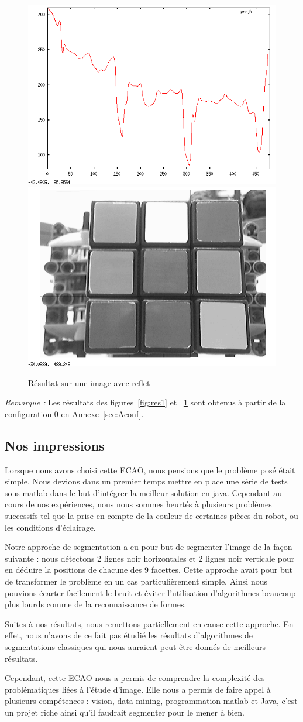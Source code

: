   \begin{figure}[!ht]
    \centering
    \includegraphics[width=0.4\linewidth]{./Images/projY_2.png}
    \includegraphics[width=0.4\linewidth]{./Images/face_2.png}
    \caption{Résultat sur une image avec reflet}
    \label{fig:res2}
   \end{figure}

\textit{Remarque : } Les résultats des figures~\ref{fig:res1} et ~\ref{fig:res2} sont obtenus à partir de la configuration 0 en Annexe~\ref{sec:Aconf}. 

\subsection{Nos impressions}
Lorsque nous avons choisi cette ECAO, nous pensions que le problème posé était simple. Nous devions dans un premier temps mettre en place une série de tests sous matlab dans le but d'intégrer la meilleur solution en java. Cependant au cours de nos expériences, nous nous sommes heurtés à plusieurs problèmes successifs tel que la prise en compte de la couleur de certaines pièces du robot, ou les conditions d'éclairage. 

Notre approche de segmentation a eu pour but de segmenter l'image de la façon suivante : nous détectons 2 lignes noir horizontales et 2 lignes noir verticale pour en déduire la positions de chacune des 9 facettes. Cette approche avait pour but de transformer le problème en un cas particulièrement simple. Ainsi nous pouvions écarter facilement le bruit et éviter l'utilisation d'algorithmes beaucoup plus lourds comme de la reconnaissance de formes. 

Suites à nos résultats, nous remettons partiellement en cause cette approche. En effet, nous n'avons de ce fait pas étudié les résultats d'algorithmes de segmentations classiques qui nous auraient peut-être donnés de meilleurs résultats.

  Cependant, cette ECAO nous a permis de comprendre la complexité des problématiques liées à l'étude d'image. Elle nous a permis de faire appel à plusieurs compétences : vision, data mining, programmation matlab et Java, c'est un projet riche ainsi qu'il faudrait segmenter pour le mener à bien. 
